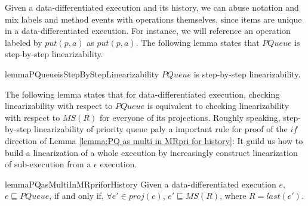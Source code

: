 Given a data-differentiated execution and its history, we can abuse notation and mix labels and method events with operations themselves, since items are unique in a data-differentiated execution. For instance, we will reference an operation labeled by $\textit{put}(p,a)$ as $\textit{put}(p,a)$. The following lemma states that $\textit{PQueue}$ is step-by-step linearizability.

\begin{restatable}{lemma}{PQueueisStepByStepLinearizability}
\label{lemma:PQueue is step-by-step linearizability}
$\textit{PQueue}$ is step-by-step linearizability.
\end{restatable}

The following lemma states that for data-differentiated execution, checking linearizability with respect to $\textit{PQueue}$ is equivalent to checking linearizability with respect to $\textit{MS}(R)$ for everyone of its projections. Roughly speaking, step-by-step linearizability of priority queue paly a important rule for proof of the $\textit{if}$ direction of Lemma \ref{lemma:PQ as multi in MRpri for history}: It guild us how to build a linearization of a whole execution by increasingly construct linearization of sub-execution from a $\epsilon$ execution.

\begin{restatable}{lemma}{PQasMultiInMRpriforHistory}
\label{lemma:PQ as multi in MRpri for history}
Given a data-differentiated execution $e$, $e \sqsubseteq \textit{PQueue}$, if and only if, $\forall e' \in \textit{proj}(e)$, $e' \sqsubseteq \textit{MS}(R)$, where $R = \textit{last}(e')$.
\end{restatable} 